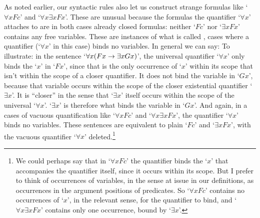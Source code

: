 As noted earlier, our syntactic rules also let us construct strange formulas like `$\forall x Fc$' and `$\forall x\exists xFx$'.   These are unusual because the formulas the quantifier `$\forall x$' attaches to are in both cases already closed formulas: neither `$Fc$' nor `$\exists x Fx$' contains any free variables.  These are instances of what is called , cases where a quantifier (`$\forall x$'  in this case) binds no variables.  In general we can say:
To illustrate: in the sentence `$\forall x(Fx \rightarrow \exists xGx)$', the universal quantifier `$\forall x$' only binds the `$x$' in `$Fx$', since that is the only occurrence of `$x$' within its scope that isn't within the scope of a closer quantifier. It does not bind the variable in `$Gx$', because that variable occurs within the scope of the closer existential quantifier `$\exists x$'.  It is ``closer'' in the sense that `$\exists x$' itself occurs within the scope of the universal `$\forall x$'. `$\exists x$' is therefore what binds the variable in `$Gx$'.  And again, in a cases of vacuous quantification like  `$\forall x Fc$' and `$\forall x\exists xFx$', the quantifier `$\forall x$' binds no variables.  These sentences are equivalent to plain `$Fc$' and `$\exists xFx$', with the vacuous quantifier `$\forall x$' deleted.\footnote{We could perhaps say that in `$\forall x Fc$' the quantifier binds the `$x$' that accompanies the quantifier itself, since it occurs within its scope.  But I prefer to think of occurrences of variables, in the sense at issue in our definitions, as occurrences in the argument positions of predicates.  So `$\forall x Fc$' contains no occurrences of `$x$', in the relevant sense, for the quantifier to bind, and `$\forall x\exists xFx$' contains only one occurrence, bound by `$\exists x$'.}








